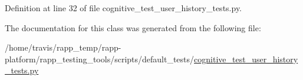 Definition at line 32 of file cognitive\-\_\-test\-\_\-user\-\_\-history\-\_\-tests.\-py.



The documentation for this class was generated from the following file\-:\begin{DoxyCompactItemize}
\item 
/home/travis/rapp\-\_\-temp/rapp-\/platform/rapp\-\_\-testing\-\_\-tools/scripts/default\-\_\-tests/\hyperlink{cognitive__test__user__history__tests_8py}{cognitive\-\_\-test\-\_\-user\-\_\-history\-\_\-tests.\-py}\end{DoxyCompactItemize}
